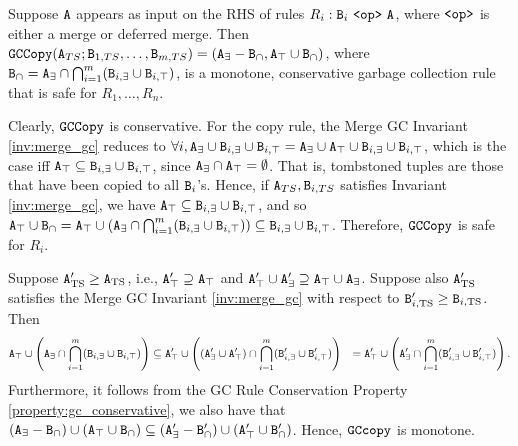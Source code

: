 \begin{example}[Copy GC]
Suppose $\tt{A}$ appears as input on the RHS of rules $R_i: \tt{B}_i ~\tt{<op>}~ \tt{A}$, where $\tt{<op>}$ is either a merge or deferred merge.
Then $\tt{GCCopy}(\tt{A}_{TS}; \tt{B}_{1,TS}, \dots, \tt{B}_{m,TS}) = \left(\tt{A}_\exists - \tt{B}_\cap, \tt{A}_\top \cup \tt{B}_\cap\right)$,
where $\tt{B}_\cap = \tt{A}_\exists \cap \bigcap_{i=1}^m (\tt{B}_{i,\exists} \cup \tt{B}_{i,\top})$,
is a monotone, conservative garbage collection rule that is safe for $R_1, \dots, R_n$.
\end{example}
Clearly, $\tt{GCCopy}$ is conservative.
For the copy rule, the Merge GC Invariant \ref{inv:merge_gc} reduces to $\forall i, \tt{A}_\exists \cup \tt{B}_{i,\exists} \cup \tt{B}_{i,\top} = \tt{A}_\exists \cup \tt{A}_\top \cup \tt{B}_{i,\exists} \cup \tt{B}_{i,\top}$, which is the case iff $\tt{A}_\top \subseteq \tt{B}_{i,\exists} \cup \tt{B}_{i,\top}$, since $\tt{A}_\exists \cap \tt{A}_\top = \emptyset$.
That is, tombstoned tuples are those that have been copied to all $\tt{B}_i$'s.
Hence, if $\tt{A}_{TS}, \tt{B}_{i,TS}$ satisfies Invariant \ref{inv:merge_gc}, we have $\tt{A}_\top \subseteq \tt{B}_{i,\exists} \cup \tt{B}_{i,\top}$, and so $\tt{A}_\top \cup \tt{B}_\cap = \tt{A}_\top \cup \left(\tt{A}_\exists \cap \bigcap_{i=1}^m (\tt{B}_{i,\exists} \cup \tt{B}_{i,\top})\right) \subseteq \tt{B}_{i,\exists} \cup \tt{B}_{i,\top}$.
Therefore, $\tt{GCCopy}$ is safe for $R_i$.

Suppose $\tt{A}_\text{TS}' \geq \tt{A}_\text{TS}$, i.e., $\tt{A}_\top' \supseteq \tt{A}_\top$ and $\tt{A}_\top' \cup \tt{A}_\exists' \supseteq \tt{A}_\top \cup \tt{A}_\exists$.
Suppose also $\tt{A}_\text{TS}'$ satisfies the Merge GC Invariant \ref{inv:merge_gc} with respect to $\tt{B}_{i,\text{TS}}' \geq \tt{B}_{i,\text{TS}}$.
Then
\begin{align*}
\tt{A}_\top \cup \left(\tt{A}_\exists \cap \bigcap_{i=1}^m (\tt{B}_{i,\exists} \cup \tt{B}_{i,\top})\right)
&\subseteq \tt{A}_\top' \cup \left((\tt{A}_\exists' \cup \tt{A}_\top') \cap \bigcap_{i=1}^m (\tt{B}_{i,\exists}' \cup \tt{B}_{i,\top}')\right)
&= \tt{A}_\top' \cup \left(\tt{A}_\exists' \cap \bigcap_{i=1}^m (\tt{B}_{i,\exists}' \cup \tt{B}_{i,\top}')\right).
\end{align*}
Furthermore, it follows from the GC Rule Conservation Property \ref{property:gc_conservative}, we also have that $(\tt{A}_\exists - \tt{B}_\cap) \cup (\tt{A}_\top \cup \tt{B}_\cap) \subseteq (\tt{A}_\exists' - \tt{B}_\cap') \cup (\tt{A}_\top' \cup \tt{B}_\cap')$.
Hence, $\tt{GCcopy}$ is monotone.

